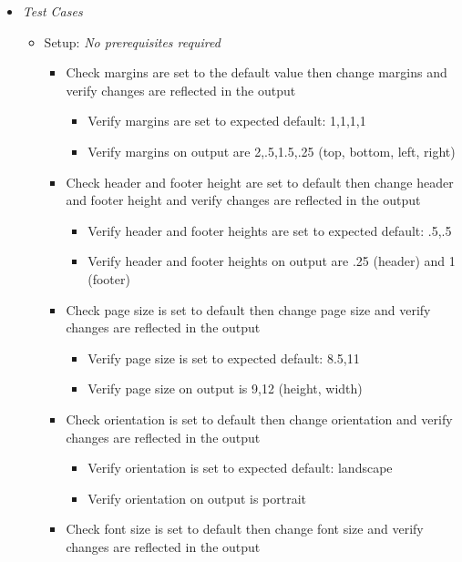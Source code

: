 \documentclass[]{article}
\providecommand{\tightlist}{%
  \setlength{\itemsep}{0pt}\setlength{\parskip}{0pt}}
\begin{document}
\begin{itemize}
\item
  \emph{Test Cases}

  \begin{itemize}
  \item
    Setup: \emph{No prerequisites required}

    \begin{itemize}
    \tightlist
    \item
      Check margins are set to the default value then change margins and
      verify changes are reflected in the output

      \begin{itemize}
      \tightlist
      \item
        Verify margins are set to expected default: 1,1,1,1
      \item
        Verify margins on output are 2,.5,1.5,.25 (top, bottom, left,
        right)
      \end{itemize}
    \item
      Check header and footer height are set to default then change
      header and footer height and verify changes are reflected in the
      output

      \begin{itemize}
      \tightlist
      \item
        Verify header and footer heights are set to expected default:
        .5,.5
      \item
        Verify header and footer heights on output are .25 (header) and
        1 (footer)
      \end{itemize}
    \item
      Check page size is set to default then change page size and verify
      changes are reflected in the output

      \begin{itemize}
      \tightlist
      \item
        Verify page size is set to expected default: 8.5,11
      \item
        Verify page size on output is 9,12 (height, width)
      \end{itemize}
    \item
      Check orientation is set to default then change orientation and
      verify changes are reflected in the output

      \begin{itemize}
      \tightlist
      \item
        Verify orientation is set to expected default: landscape
      \item
        Verify orientation on output is portrait
      \end{itemize}
    \item
      Check font size is set to default then change font size and verify
      changes are reflected in the output


\end{itemize}
\end{itemize}
\end{itemize}
\end{document}
